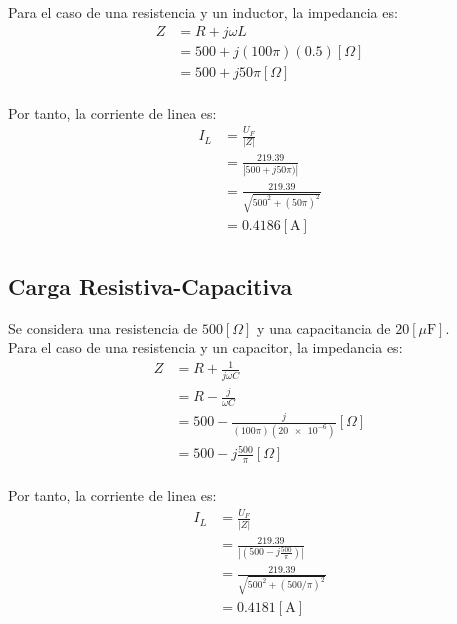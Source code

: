 \documentclass[letter,11pt]{article}
\begin{document}
Para el caso de una resistencia y un inductor, la impedancia es:
\begin{equation*}
    \begin{split}
        Z&=R+j\omega L\\
         &=500+j(100\pi)(0.5)[\Omega]\\
         &=500+j50\pi[\Omega]\\
    \end{split}
\end{equation*}

Por tanto, la corriente de linea es:
\begin{equation*}
    \begin{split}
        I_L&=\frac{U_F}{|Z|}\\
           &=\frac{219.39}{|500+j50\pi)|}\\
           &=\frac{219.39}{\sqrt{500^2+(50\pi)^2}}\\
           &=0.4186[\text{A}]\\
    \end{split}
\end{equation*}

\vspace{0.6cm}
\subsection{Carga Resistiva-Capacitiva}
Se considera una resistencia de $500[\Omega]$ y una capacitancia de
$20[\mu\text{F}]$.\\

Para el caso de una resistencia y un capacitor, la impedancia es:
\begin{equation*}
    \begin{split}
        Z&=R+\frac{1}{j\omega C}\\
         &=R-\frac{j}{\omega C}\\
         &=500-\frac{j}{(100\pi)(\num{20e-6})}[\Omega]\\
         &=500-j\frac{500}{\pi}[\Omega]\\
    \end{split}
\end{equation*}

Por tanto, la corriente de linea es:
\begin{equation*}
    \begin{split}
        I_L&=\frac{U_F}{|Z|}\\
           &=\frac{219.39}{|(500-j\frac{500}{\pi})|}\\
           &=\frac{219.39}{\sqrt{500^2+(500/\pi)^2}}\\
           &=0.4181[\text{A}]\\
    \end{split}
\end{equation*}
\end{document}
